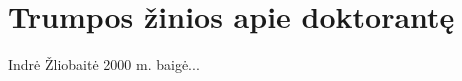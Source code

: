 
\section{\texorpdfstring{Trumpos \v{z}inios apie doktorant\k{e}}{Trumpos \v{z}inios apie doktorant\k{e}}}
\label{cha:cv_lt}


Indrė Žliobaitė 2000 m. baigė...